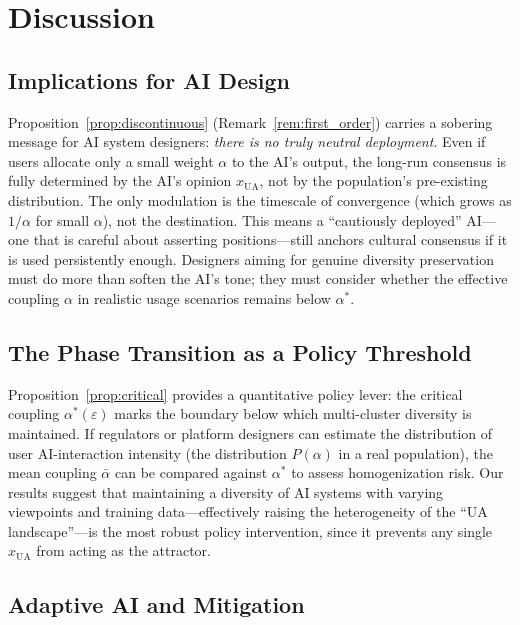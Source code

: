 \documentclass{article}
\theoremstyle{plain}
\theoremstyle{definition}
\theoremstyle{remark}
\newcommand{\xUA}{x_{\mathrm{UA}}}
\begin{document}
\section{Discussion}
\label{sec:discussion}

\subsection{Implications for AI Design}

Proposition~\ref{prop:discontinuous} (Remark~\ref{rem:first_order}) carries
a sobering message for AI system designers: \emph{there is no truly neutral
deployment}.  Even if users allocate only a small weight $\alpha$ to the AI's
output, the long-run consensus is fully determined by the AI's opinion
$\xUA$, not by the population's pre-existing distribution.
The only modulation is the timescale of convergence (which grows as
$1/\alpha$ for small $\alpha$), not the destination.
This means a ``cautiously deployed'' AI---one that is careful about
asserting positions---still anchors cultural consensus if it is used
persistently enough.
Designers aiming for genuine diversity preservation must do more than
soften the AI's tone; they must consider whether the effective
coupling $\alpha$ in realistic usage scenarios remains below $\alpha^*$.

\subsection{The Phase Transition as a Policy Threshold}

Proposition~\ref{prop:critical} provides a quantitative policy lever:
the critical coupling $\alpha^*(\varepsilon)$ marks the boundary below
which multi-cluster diversity is maintained.
If regulators or platform designers can estimate the distribution of
user AI-interaction intensity (the distribution $P(\alpha)$ in a
real population), the mean coupling $\bar\alpha$ can be compared
against $\alpha^*$ to assess homogenization risk.
Our results suggest that maintaining a diversity of AI systems with
varying viewpoints and training data---effectively raising the heterogeneity
of the ``UA landscape''---is the most robust policy intervention,
since it prevents any single $\xUA$ from acting as the attractor.

\subsection{Adaptive AI and Mitigation}
\end{document}
